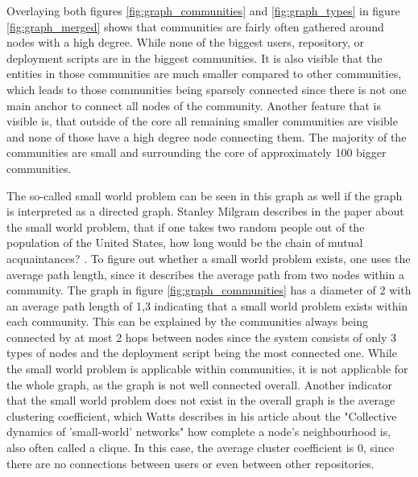 Overlaying both figures \ref{fig:graph_communities} and \ref{fig:graph_types} in figure \ref{fig:graph_merged} shows that communities are fairly often gathered around nodes with a high degree. While none of the biggest users, repository, or deployment scripts are in the biggest communities. It is also visible that the entities in those communities are much smaller compared to other communities, which leads to those communities being sparsely connected since there is not one main anchor to connect all nodes of the community. Another feature that is visible is, that outside of the core all remaining smaller communities are visible and none of those have a high degree node connecting them. The majority of the communities are small and surrounding the core of approximately 100 bigger communities.

The so-called small world problem can be seen in this graph as well if the graph is interpreted as a directed graph. Stanley Milgram describes in the paper about the small world problem, that if one takes two random people out of the population of the United States, how long would be the chain of mutual acquaintances? \cite{SmallWorld}. To figure out whether a small world problem exists, one uses the average path length, since it describes the average path from two nodes within a community. The graph in figure \ref{fig:graph_communities} has a diameter of 2 with an average path length of 1,3 indicating that a small world problem exists within each community. This can be explained by the communities always being connected by at most 2 hops between nodes since the system consists of only 3 types of nodes and the deployment script being the most connected one. While the small world problem is applicable within communities, it is not applicable for the whole graph, as the graph is not well connected overall. Another indicator that the small world problem does not exist in the overall graph is the average clustering coefficient, which Watts describes in his article about the "Collective dynamics of 'small-world' networks"\cite{Watts1998Collective} how complete a node's neighbourhood is, also often called a clique. In this case, the average cluster coefficient is 0, since there are no connections between users or even between other repositories.


